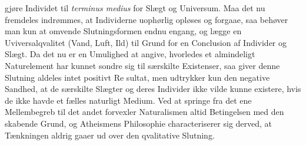 \documentclass[12pt]{book}
\newcommand{\opage}[1]{\marginnote{\footnotesize\textit{[#1]}}}
\begin{document}
gjøre Individet til \textit{terminus medius} for Slægt og Universum. Maa det nu
fremdeles indrømmes, at Individerne uophørlig opløses og forgaae, saa behøver man
kun at omvende Slutningsformen endnu engang, og lægge en Uviversalqvalitet (Vand,
Luft, Ild) til Grund for en Conclusion af Individer og Slægt. Da det nu er en
Umulighed at angive, hvorledes et almindeligt Naturelement har kunnet sondre sig til
særskilte Existenser, saa giver denne Slutning aldeles intet positivt Re%
\opage{79}sultat, men udtrykker kun den negative Sandhed, at de særskilte Slægter og deres
Individer ikke vilde kunne existere, hvis de ikke havde et fælles naturligt Medium.
Ved at springe fra det ene Mellembegreb til det andet forvexler Naturalismen altid
Betingelsen med den skabende Grund, og Atheismens Philosophie characteriserer sig
derved, at Tænkningen aldrig gaaer ud over den qvalitative Slutning.
\end{document}
